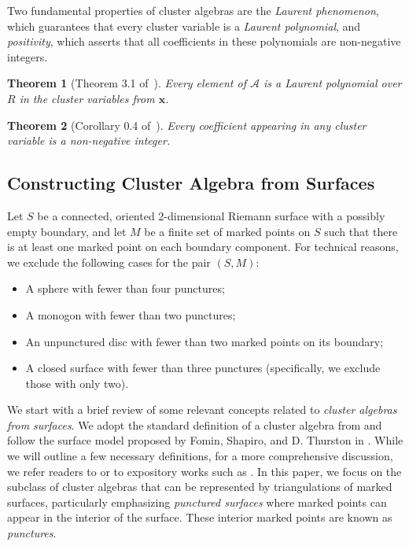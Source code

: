 \documentclass{article}
\newcommand{\x}{\mathbf{x}}
\newtheorem{theorem}{Theorem}
\theoremstyle{remark}
\begin{document}
Two fundamental properties of cluster algebras are the \emph{Laurent phenomenon}, which guarantees that every cluster variable is a \emph{Laurent polynomial}, and \emph{positivity}, which asserts that all coefficients in these polynomials are non-negative integers.

\begin{theorem}[Theorem 3.1 of~\cite{FZ2002}]
    Every element of $\mathcal{A}$ is a Laurent polynomial over $R$ in the cluster variables from $\x$.
\end{theorem}

\begin{theorem}[Corollary 0.4 of~\cite{GHKK18}]
    Every coefficient appearing in any cluster variable is a non-negative integer.
\end{theorem}


\subsection{Constructing Cluster Algebra from Surfaces}
Let \( S \) be a connected, oriented 2-dimensional Riemann surface with a possibly empty boundary, and let \( M \) be a finite set of marked points on \( S \) such that there is at least one marked point on each boundary component. For technical reasons, we exclude the following cases for the pair $(S, M)$: 
\begin{itemize}
    \item A sphere with fewer than four punctures;
    \item A monogon with fewer than two punctures;
    \item An unpunctured disc with fewer than two marked points on its boundary;
    \item A closed surface with fewer than three punctures (specifically, we exclude those with only two).
\end{itemize}

We start with a brief review of some relevant concepts related to \emph{cluster algebras from surfaces}. We adopt the standard definition of a cluster algebra from \cite{FZ2002} and follow the surface model proposed by Fomin, Shapiro, and D. Thurston in \cite{FST-I}. While we will outline a few necessary definitions, for a more comprehensive discussion, we refer readers to \cite{FST-I} or to expository works such as \cite{glick2017introduction, williams2014cluster}. In this paper, we focus on the subclass of cluster algebras that can be represented by triangulations of marked surfaces, particularly emphasizing \emph{punctured surfaces} where marked points can appear in the interior of the surface. These interior marked points are known as \emph{punctures}.
\end{document}
